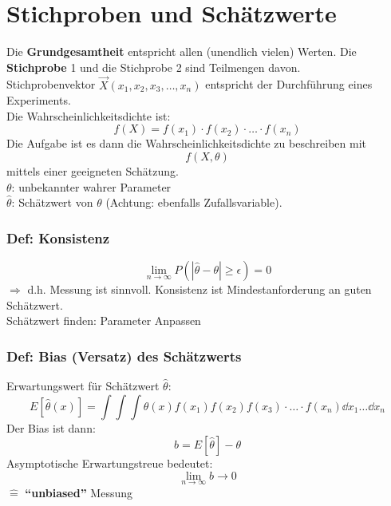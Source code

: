 \setcounter{chapter}{6}

\chapter{Stichproben und Schätzwerte}

Die \textbf{Grundgesamtheit} entspricht allen (unendlich vielen) Werten. Die \textbf{Stichprobe} 1 und die Stichprobe 2 sind Teilmengen davon.\\[5pt]
Stichprobenvektor $ \vec{X} (x_1, x_2, x_3, \dots, x_n) $ entspricht der Durchführung eines Experiments.\\[5pt]
Die Wahrscheinlichkeitsdichte ist:
\begin{equation*}
f(X) = f(x_1) \cdot f(x_2) \cdot \dots \cdot f(x_n)
\end{equation*}
Die Aufgabe ist es dann die Wahrscheinlichkeitsdichte zu beschreiben mit
\begin{equation*}
f(X, \theta)
\end{equation*}
mittels einer geeigneten Schätzung.\\[5pt]
$ \theta $: unbekannter wahrer Parameter\\
$ \hat{\theta} $: Schätzwert von $ \theta $ (Achtung: ebenfalls Zufallsvariable).

\subsection{Def: Konsistenz}

\begin{equation*}
\lim_{n \to \infty} P \left(|\hat{\theta} - \theta| \ge \epsilon\right) = 0
\end{equation*}
$ \Rightarrow $ d.h. Messung ist sinnvoll. Konsistenz ist Mindestanforderung an guten Schätzwert.\\
Schätzwert finden: Parameter Anpassen

\subsection{Def: Bias (Versatz) des Schätzwerts}

Erwartungswert für Schätzwert $ \hat{\theta} $:
\begin{equation*}
E[\hat{\theta}(x)] = \int \int \int \hat{\theta}(x) f(x_1) f(x_2) f(x_3) \cdot \dots \cdot f(x_n) \dd x_1 \dots \dd x_n
\end{equation*}
Der Bias ist dann:
\begin{equation*}
b = E[\hat{\theta}] - \theta
\end{equation*}
Asymptotische Erwartungstreue bedeutet:
\begin{equation*}
\lim_{n \to \infty} b \to 0
\end{equation*}
$ \widehat{=} $ \textbf{``unbiased''} Messung

